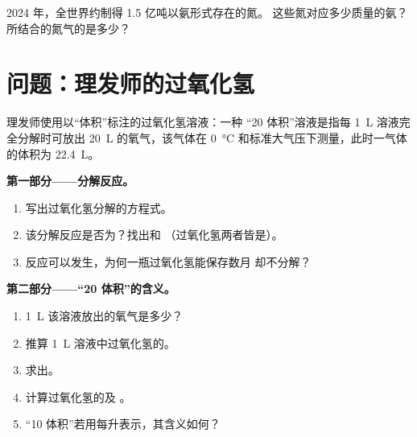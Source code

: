 \begin{exercise}[$\star\star\star$]\label{exo:g12:catalysis:15}
2024 年，全世界约制得 1.5 亿吨以氨形式存在的氮。
这些氮对应多少质量的氨？所结合的氮气的是多少？
\end{exercise}

\section{问题：理发师的过氧化氢}

\begin{problem}
\label{pb:g12:catalysis:1}
理发师使用以“体积”标注的过氧化氢溶液：一种
“20 体积”溶液是指每 \qty{1}{L} 溶液完全分解时可放出 \qty{20}{L}
的氧气，该气体在
\qty{0}{\celsius} 和标准大气压下测量，此时一气体
的体积为 \qty{22.4}{L}。

\medskip
\noindent\textbf{第一部分——分解反应。}
\begin{enumerate}
  \item 写出过氧化氢分解的方程式。
  \item 该分解反应是否为？找出和
        （过氧化氢两者皆是）。
  \item 反应可以发生，为何一瓶过氧化氢能保存数月
        却不分解？
\end{enumerate}

\medskip
\noindent\textbf{第二部分——“20 体积”的含义。}
\begin{enumerate}[resume]
  \item \qty{1}{L} 该溶液放出的氧气是多少？
  \item 推算 \qty{1}{L} 溶液中过氧化氢的。
  \item 求出。
  \item 计算过氧化氢的及
        。
  \item “10 体积”若用每升表示，其含义如何？
\end{enumerate}


\end{problem}
